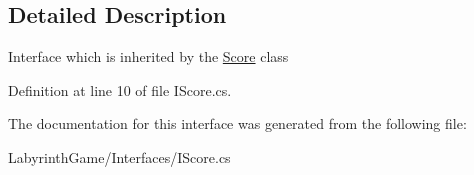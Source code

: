 \subsection{Detailed Description}
Interface which is inherited by the \hyperlink{class_labyrinth_game_1_1_score}{Score} class 



Definition at line 10 of file I\+Score.\+cs.



The documentation for this interface was generated from the following file\+:\begin{DoxyCompactItemize}
\item 
Labyrinth\+Game/\+Interfaces/I\+Score.\+cs\end{DoxyCompactItemize}
